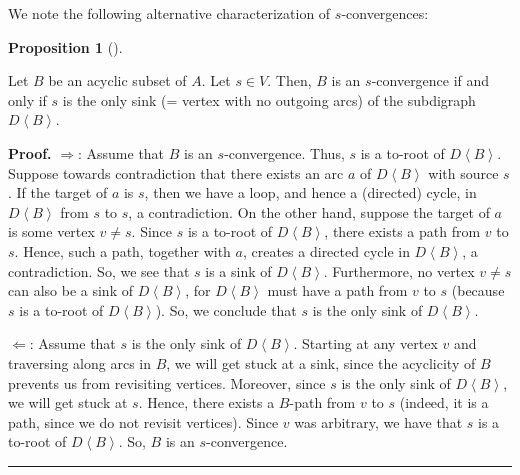 \documentclass[numbers=enddot,12pt,final,onecolumn,notitlepage]{scrartcl}%
\theoremstyle{definition}
\newtheorem{prop}[theo]{Proposition}
\newenvironment{proposition}[1][]
{\begin{prop}[#1]\begin{leftbar}}
{\end{leftbar}\end{prop}}
\newenvironment{proof}[1][Proof]{\noindent\textbf{#1.} }{\ \rule{0.5em}{0.5em}}
\theoremstyle{plainsl}
\begin{document}
We note the following alternative characterization of $s$-convergences:

\begin{proposition}
Let $B$ be an acyclic subset of $A$.
Let $s \in V$.
Then, $B$ is an $s$-convergence if and only if $s$ is the only sink (= vertex with
no outgoing arcs) of the subdigraph $D\left\langle B\right\rangle $.
\end{proposition}

\begin{proof}
$\Longrightarrow$: Assume that $B$ is an $s$-convergence. Thus, $s$ is a to-root of $D \left\langle B \right\rangle$. Suppose towards contradiction that there exists an arc $a$ of $D \left\langle B \right\rangle$ with source $s$. If the target of $a$ is $s$, then we have a loop, and hence a (directed) cycle, in $D \left\langle B \right\rangle$ from $s$ to $s$, a contradiction. On the other hand, suppose the target of $a$ is some vertex $v \neq s$. Since $s$ is a to-root of $D \left\langle B \right\rangle$, there exists a path from $v$ to $s$. Hence, such a path, together with $a$, creates a directed cycle in $D \left\langle B \right\rangle$, a contradiction. So, we see that $s$ is a sink of $D \left\langle B \right\rangle$. Furthermore, no vertex $v \neq s$ can also be a sink of $D \left\langle B \right\rangle$, for $D \left\langle B \right\rangle $ must have a path from $v$ to $s$ (because $s$ is a to-root of $D \left\langle B \right\rangle$). So, we conclude that $s$ is the only sink of $D \left\langle B \right\rangle$.

\medskip
$\Longleftarrow$: Assume that $s$ is the only sink of $D \left\langle B \right\rangle$. Starting at any vertex $v$ and traversing along arcs in $B$, we will get stuck at a sink, since the acyclicity of $B$ prevents us from revisiting vertices. Moreover, since $s$ is the only sink of $D \left\langle B \right\rangle$, we will get stuck at $s$. Hence, there exists a $B$-path from $v$ to $s$ (indeed, it is a path, since we do not revisit vertices). Since $v$ was arbitrary, we have that $s$ is a to-root of $D \left\langle B \right\rangle$. So, $B$ is an $s$-convergence.
\end{proof}
\end{document}
